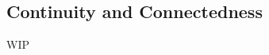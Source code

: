 \documentclass[../poma-notes.tex]{subfiles}
\begin{document}
\subsection*{Continuity and Connectedness}

WIP
\end{document}

